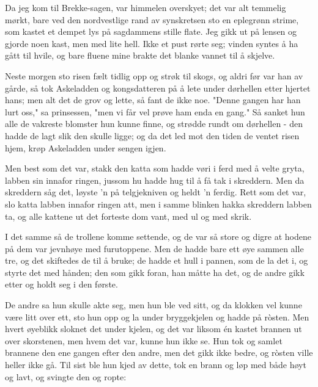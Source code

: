 \documentclass[a4paper]{report}
\begin{document}
\the\pretolerance
\the\tolerance
\the\hbadness
\the\hyphenpenalty

\begin{minipage}{0.5\textwidth}
Da jeg kom til Brekke-sagen, var himmelen overskyet; det var alt temmelig mørkt, bare ved den nordvestlige rand av synskretsen sto en eplegrønn strime, som kastet et dempet lys på sagdammens stille flate. Jeg gikk ut på lensen og gjorde noen kast, men med lite hell. Ikke et pust rørte seg; vinden syntes å ha gått til hvile, og bare fluene mine brakte det blanke vannet til å skjelve.

Neste morgen sto risen fælt tidlig opp og strøk til skogs, og aldri før var han av gårde, så tok Askeladden og kongsdatteren på å lete under dørhellen etter hjertet hans; men alt det de grov og lette, så fant de ikke noe. "Denne gangen har han lurt oss," sa prinsessen, "men vi får vel prøve ham enda en gang." Så sanket hun alle de vakreste blomster hun kunne finne, og strødde rundt om dørhellen - den hadde de lagt slik den skulle ligge; og da det led mot den tiden de ventet risen hjem, krøp Askeladden under sengen igjen.

Men best som det var, stakk den katta som hadde vøri i ferd med å velte gryta, labben sin innafor ringen, jussom hu hadde hug til å få tak i skreddern. Men da skreddern såg det, løyste 'n på telgjekniven og heldt 'n ferdig. Rett som det var, slo katta labben innafor ringen att, men i samme blinken hakka skreddern labben ta, og alle kattene ut det forteste dom vant, med ul og med skrik.

I det samme så de trollene komme settende, og de var så store og digre at hodene på dem var jevnhøye med furutoppene. Men de hadde bare ett øye sammen alle tre, og det skiftedes de til å bruke; de hadde et hull i pannen, som de la det i, og styrte det med hånden; den som gikk foran, han måtte ha det, og de andre gikk etter og holdt seg i den første.




De andre sa hun skulle akte seg, men hun ble ved sitt, og da klokken vel kunne være litt over ett, sto hun opp og la under bryggekjelen og hadde på ròsten. Men hvert øyeblikk sloknet det under kjelen, og det var liksom én kastet brannen ut over skorstenen, men hvem det var, kunne hun ikke se. Hun tok og samlet brannene den ene gangen efter den andre, men det gikk ikke bedre, og ròsten ville heller ikke gå. Til sist ble hun kjed av dette, tok en brann og løp med både høyt og lavt, og svingte den og ropte:


\end{minipage}
\end{document}
